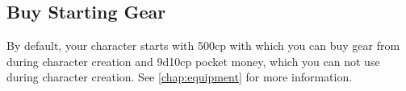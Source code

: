 \begin{multicols}{2}
\section{Buy Starting Gear}
By default, your character starts with 500cp with which you can buy gear from during character creation and 9d10cp pocket money, which you can not use during character creation.
See \cref{chap:equipment} for more information.

\end{multicols}
